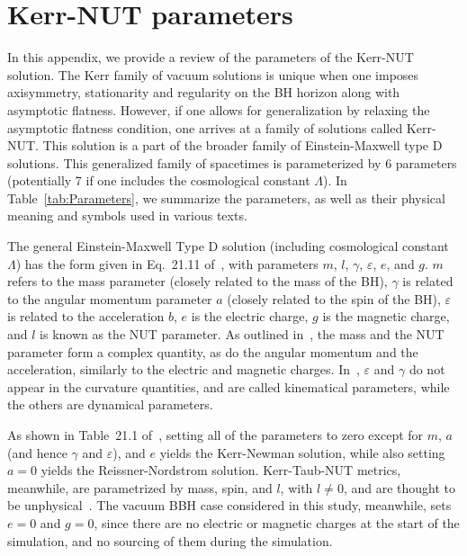 

\section{Kerr-NUT parameters}
\label{appendix:KerrNUTParameters}


In this appendix, we provide a review of the parameters of the Kerr-NUT solution. The Kerr family of vacuum solutions is unique when one imposes axisymmetry, stationarity and regularity on the BH horizon along with asymptotic flatness. However, if one allows for generalization by relaxing the asymptotic flatness condition, one arrives at a family of solutions called Kerr-NUT. This solution is a part of the broader family of Einstein-Maxwell type D solutions. This generalized family of spacetimes is parameterized by 6 parameters (potentially 7 if one includes the cosmological constant $\Lambda$). In Table~\ref{tab:Parameters}, we summarize the parameters, as well as their physical meaning and symbols used in various texts.

The general Einstein-Maxwell Type D solution (including cosmological constant $\Lambda$) has the form given in Eq.~21.11 of~\cite{stephani2009exact}, with parameters $m$, $l$, $\gamma$, $\varepsilon$, $e$, and $g$. $m$ refers to the mass parameter (closely related to the mass of the BH), $\gamma$ is related to the angular momentum parameter $a$ (closely related to the spin of the BH), $\varepsilon$ is related to the acceleration $b$, $e$ is the electric charge, $g$ is the magnetic charge, and $l$ is known as the NUT parameter. As outlined in~\cite{PLEBANSKI197698}, the mass and the NUT parameter form a complex quantity, as do the angular momentum and the acceleration, similarly to the electric and magnetic charges. In~\cite{PLEBANSKI197698}, $\varepsilon$ and $\gamma$ do not appear in the curvature quantities, and are called kinematical parameters, while the others are dynamical parameters.

As shown in Table~21.1 of~\cite{stephani2009exact}, setting all of the parameters to zero except for $m$, $a$ (and hence $\gamma$ and $\varepsilon$), and $e$ yields the Kerr-Newman solution, while also setting $a = 0$ yields the Reissner-Nordstrom solution. Kerr-Taub-NUT metrics, meanwhile, are parametrized by mass, spin, and $l$, with $l \neq 0$, and are thought to be unphysical~\cite{kaluzaklein}. The vacuum BBH case considered in this study, meanwhile, sets $e = 0$ and $g = 0$, since there are no electric or magnetic charges at the start of the simulation, and no sourcing of them during the simulation.

